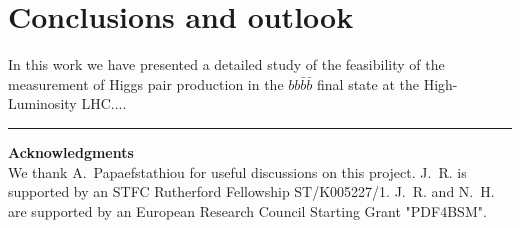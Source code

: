 \section{Conclusions and outlook}

In this work we have presented a detailed study of the feasibility
of the measurement of Higgs pair production in the $bb\bar{b}\bar{b}$
final state at the High-Luminosity LHC....




\bigskip
\bigskip
\begin{center}
\rule{5cm}{.1pt}
\end{center}
\bigskip
\bigskip

{\bf\noindent  Acknowledgments \\}
We thank A.~Papaefstathiou for useful discussions on this project.
%
J.~R. is supported by an STFC Rutherford Fellowship ST/K005227/1.
%
J.~R. and N.~H. are
supported by an European Research Council Starting Grant "PDF4BSM".
%
